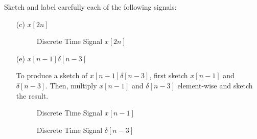 \documentclass[fleqn]{article}
\begin{document}
\begin{enumerate}[nolistsep]
		Sketch and label carefully each of the following signals:
		
		\begin{enumerate}[nolistsep]
			\item[(c)] $x[2n]$
			
			\renewcommand{\thefigure}{P2.21-C}
			
			\begin{figure}[H]				
			\centerline{}
		\caption{Discrete Time Signal $x[2n]$}
		\label{part_c}
		\end{figure} \break
		
			\item[(e)] $x[n - 1]\delta[n - 3]$
			
			To produce a sketch of $x[n - 1]\delta[n - 3]$, first sketch $x[n - 1]$ and $\delta[n - 3]$. Then, multiply $x[n - 1]$ and $\delta[n - 3]$ element-wise and sketch the result.
			
			\renewcommand{\thefigure}{P2.21-E-1}
			
			\begin{figure}[H]
			\centerline{}
		\caption{Discrete Time Signal $x[n-1]$}
		\label{part_e_x_nm1}
		\end{figure}
			
			\renewcommand{\thefigure}{P2.21-E-2}
			
			\begin{figure}[H]
			\centerline{}
		\caption{Discrete Time Signal $\delta[n-3]$}
		\label{part_e_delta_nm3}
		\end{figure}
		

\end{enumerate}
\end{enumerate}
\end{document}
